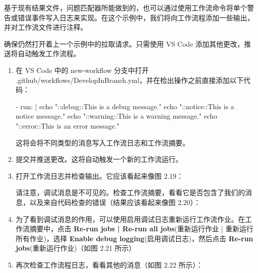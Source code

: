 
基于现有结果文件，问题匹配器所能做到的，也可以通过使用工作流命令将单个警告或错误事件写入日志来实现。在这个示例中，我们将向工作流程添加一些输出，并对工作流文件进行注释。


确保仍然打开着上一个示例中的拉取请求。只需使用 VS Code 添加其他更改，推送将自动触发工作流程。


\begin{enumerate}
\item 
在 VS Code 中的 new-workflow 分支中打开 .github/workflows/DevelopInBranch.yml，并在检出操作之前直接添加以下代码：

\begin{shell}
- run: |
  echo "::debug::This is a debug message."
  echo "::notice::This is a notice message."
  echo "::warning::This is a warning message."
  echo "::error::This is an error message."
\end{shell}

这将会将不同类型的消息写入工作流日志和工作流摘要。

\item 
提交并推送更改。这将自动触发一个新的工作流运行。

\item 
打开工作流日志并检查输出。它应该看起来像图 2.19：


请注意，调试消息是不可见的。检查工作流摘要，看看它是否包含了我们的消息，以及来自代码检查的错误（结果应该看起来像图 2.20）：


\item 
为了看到调试消息的作用，可以使用启用调试日志重新运行工作流作业。在工作流摘要中，点击 \textbf{Re-run jobs | Re-run all jobs}(重新运行作业 | 重新运行所有作业)，选择 \textbf{ Enable debug logging}(启用调试日志)，然后点击 \textbf{Re-run jobs}(重新运行作业)（如图 2.21 所示）


\item 
再次检查工作流程日志，看看其他的消息（如图 2.22 所示）：



\end{enumerate}
